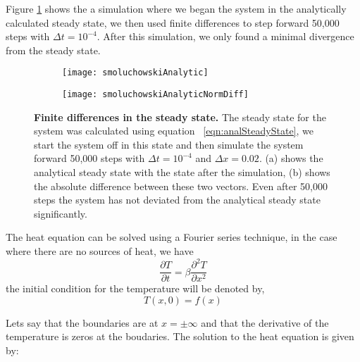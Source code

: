Figure \ref{fig:smoluchowskiCompare} shows the a simulation where we began the system in the analytically calculated steady state, we then used finite differences to step forward 50,000 steps with $\Delta t = 10^{-4}$. After this simulation, we only found a minimal divergence from the steady state.
\begin{figure}
	\begin{subfigure}{0.49\textwidth}
	\texttt{[image: smoluchowskiAnalytic]}
	\end{subfigure}
	\begin{subfigure}{0.49\textwidth}
	\texttt{[image: smoluchowskiAnalyticNormDiff]}
	\end{subfigure}
	\caption{\textbf{Finite differences in the steady state.} The steady state for the system was calculated using equation ~\ref{eqn:analSteadyState}, we start the system off in this state and then simulate the system forward 50,000 steps with $\Delta t = 10^{-4}$ and $\Delta x = 0.02$. (a) shows the analytical steady state with the state after the simulation, (b) shows the absolute difference between these two vectors. Even after 50,000 steps the system has not deviated from the analytical steady state significantly. \label{fig:smoluchowskiCompare}}
\end{figure}

The heat equation can be solved using a Fourier series technique, in the case where there are no sources of heat, we have
\begin{equation}
\frac{\partial T}{\partial t} = \beta \frac{\partial^2 T}{\partial x^2}
\end{equation}
the initial condition for the temperature will be denoted by,
\begin{equation}
T(x, 0) = f(x)
\end{equation}

Lets say that the boundaries are at $x = \pm \infty$ and that the derivative of the temperature is zeros at the boudaries. The solution to the heat equation is given by:

